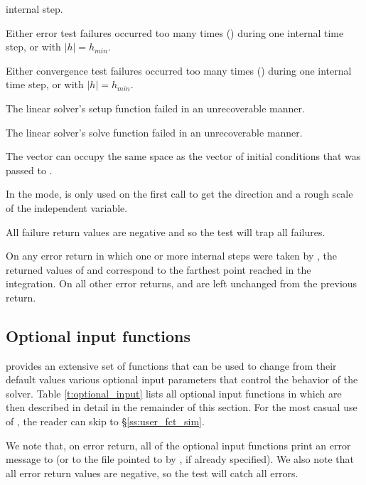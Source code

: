 {\begin{args}
    internal step.
  \item[\Id{CV\_ERR\_FAILURE}]
    Either error test failures occurred too many times () during one 
    internal time step, or with $|h| = h_{min}$.
  \item[\Id{CV\_CONV\_FAILURE}] 
    Either convergence test failures occurred too many times () during 
    one internal time step, or with $|h| = h_{min}$.             
  \item[\Id{CV\_LSETUP\_FAIL}] 
    The linear solver's setup function failed in an unrecoverable manner.
  \item[\Id{CV\_LSOLVE\_FAIL}] 
    The linear solver's solve function failed in an unrecoverable manner.
  \end{args} 
}
{
  The vector  can occupy the same space as the  vector of 
  initial conditions that was passed to . 

  In the  mode,  is only used on the first call
  to get the direction and a rough scale of the independent variable.

  All failure return values are negative and so the test 
  will trap all  failures.

  On any error return in which one or more internal steps were taken by
  , the returned values of  and  correspond to
  the farthest point reached in the integration.  On all other error returns,
   and  are left unchanged from the previous 
  return.

}

\subsection{Optional input functions}\label{ss:optional_input}

{\cvodes} provides an extensive set of functions that can be used to change
from their default values various optional input parameters that control the
behavior of the {\cvodes} solver. 
Table \ref{t:optional_input} lists all optional input functions in {\cvodes} which 
are then described in detail in the remainder of this section.
For the most casual use of {\cvodes}, the reader can skip to \S\ref{ss:user_fct_sim}.

We note that, on error return, all of the optional input functions print an error message
to  (or to the file pointed to by , if already specified).
We also note that all error return values are negative, so the test 
will catch all errors.

